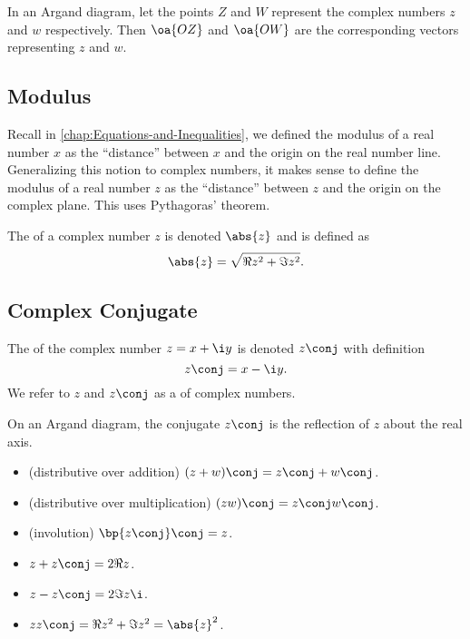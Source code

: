 In an Argand diagram, let the points $Z$ and $W$ represent the complex numbers $z$ and $w$ respectively. Then $\oa{OZ}$ and $\oa{OW}$ are the corresponding vectors representing $z$ and $w$.

\subsection{Modulus}

Recall in \SS\ref{chap:Equations-and-Inequalities}, we defined the modulus of a real number $x$ as the ``distance'' between $x$ and the origin on the real number line. Generalizing this notion to complex numbers, it makes sense to define the modulus of a real number $z$ as the ``distance'' between $z$ and the origin on the complex plane. This uses Pythagoras' theorem.

\begin{definition}
    The  of a complex number $z$ is denoted $\abs{z}$ and is defined as \[\abs{z} = \sqrt{\Re{z}^2 + \Im{z}^2}.\]
\end{definition}

\subsection{Complex Conjugate}

\begin{definition}
    The  of the complex number $z = x + \i y$ is denoted $z\conj$ with definition \[z\conj = x - \i y.\] We refer to $z$ and $z\conj$ as a  of complex numbers.
\end{definition}

On an Argand diagram, the conjugate $z\conj$ is the reflection of $z$ about the real axis.

\begin{fact}
    \phantom{.}
    \begin{itemize}
        \item (distributive over addition) $(z + w)\conj = z\conj + w\conj$.
        \item (distributive over multiplication) $(zw)\conj = z\conj w\conj$.
        \item (involution) $\bp{z\conj}\conj = z$.
        \item $z + z\conj = 2\Re{z}$.
        \item $z - z\conj = 2\Im{z} \i$.
        \item $z z\conj = \Re{z}^2 + \Im{z}^2 = \abs{z}^2$.
    \end{itemize}
\end{fact}

